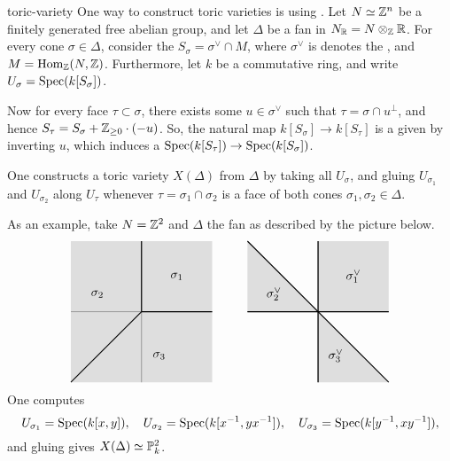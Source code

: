 \begin{example}{toric-variety}
    One way to construct toric varieties is using . Let $N \simeq \mathbb{Z}^n$ be a finitely generated free abelian group, and let $\Delta$ be a fan in $N_{\mathbb{R}} = N \otimes_{\mathbb{Z}} \mathbb{R}$. For every cone $\sigma \in \Delta$, consider the  $S_\sigma = \sigma^\vee \cap M$, where $\sigma^\vee$ is denotes the , and $M = \text{Hom}_{\mathbb{Z}}(N, \mathbb{Z})$. Furthermore, let $k$ be a commutative ring, and write $U_\sigma = \operatorname{Spec}(k[S_\sigma])$.
    
    Now for every face $\tau \subset \sigma$, there exists some $u \in \sigma^\vee$ such that $\tau = \sigma \cap u^\perp$, and hence $S_\tau = S_\sigma + \mathbb{Z}_{\ge 0} \cdot (-u)$. So, the natural map $k[S_\sigma] \to k[S_\tau]$ is a  given by inverting $u$, which induces a  $\operatorname{Spec}(k[S_\tau]) \to \operatorname{Spec}(k[S_\sigma])$.
    
    One constructs a toric variety $X(\Delta)$ from $\Delta$ by taking all $U_\sigma$, and gluing $U_{\sigma_1}$ and $U_{\sigma_2}$ along $U_\tau$ whenever $\tau = \sigma_1 \cap \sigma_2$ is a face of both cones $\sigma_1, \sigma_2 \in \Delta$.
    
    As an example, take $N = \mathbb{Z}^2$ and $\Delta$ the fan as described by the picture below.
    \[ \begin{tikzpicture}
        \begin{scope}
            \draw (-2, 0) -- (2, 0);
            \draw (0, -2) -- (0, 2);
            \fill[fill=gray!50, opacity=0.5] (-2, -2) -- (2, -2) -- (2, 2) -- (-2, 2);
            \draw[thick] (0, 0) -- (2, 0);
            \draw[thick] (0, 0) -- (0, 2);
            \draw[thick] (0, 0) -- (-2, -2);
            \node at (1, 1) {$\sigma_1$};
            \node at (-1.25, 0.5) {$\sigma_2$};
            \node at (0.5, -1.25) {$\sigma_3$};
        \end{scope}
        \begin{scope}[shift={(5, 0)}]
            \draw (-2, 0) -- (2, 0);
            \draw (0, -2) -- (0, 2);
            \fill[fill=gray!50, opacity=0.5] (0, 0) -- (2, 0) -- (2, 2) -- (0, 2);
            \fill[fill=gray!50, opacity=0.5] (0, 0) -- (-2, 0) -- (-2, 2);
            \fill[fill=gray!50, opacity=0.5] (0, 0) -- (0, -2) -- (2, -2);
            \draw[thick] (-2, 0) -- (2, 0);
            \draw[thick] (0, -2) -- (0, 2);
            \draw[thick] (-2, 2) -- (2, -2);
            \node at (1, 1) {$\sigma_1^\vee$};
            \node at (-1.25, 0.5) {$\sigma_2^\vee$};
            \node at (0.5, -1.25) {$\sigma_3^\vee$};
        \end{scope}
    \end{tikzpicture} \]
    One computes
    \[ U_{\sigma_1} = \operatorname{Spec}(k[x, y]), \quad U_{\sigma_2} = \operatorname{Spec}(k[x^{-1}, yx^{-1}]), \quad U_{\sigma_3} = \operatorname{Spec}(k[y^{-1}, xy^{-1}]) , \]
    and gluing gives $X(\Delta) \simeq \mathbb{P}_k^2$.    
\end{example}

